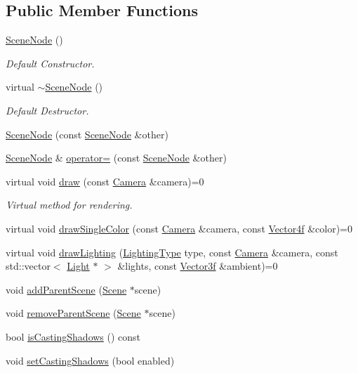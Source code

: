 \subsection*{Public Member Functions}
\begin{DoxyCompactItemize}
\item 
\hyperlink{classburn_1_1_scene_node_a107d42062677132d1104391fd2bf2530}{Scene\-Node} ()
\begin{DoxyCompactList}\small\item\em Default Constructor. \end{DoxyCompactList}\item 
virtual \hyperlink{classburn_1_1_scene_node_a16dc2ff687b1ed4182ca70be08be76a0}{$\sim$\-Scene\-Node} ()
\begin{DoxyCompactList}\small\item\em Default Destructor. \end{DoxyCompactList}\item 
\hyperlink{classburn_1_1_scene_node_a8b3208662e333b416a50ead58fb85a40}{Scene\-Node} (const \hyperlink{classburn_1_1_scene_node}{Scene\-Node} \&other)
\item 
\hyperlink{classburn_1_1_scene_node}{Scene\-Node} \& \hyperlink{classburn_1_1_scene_node_ac46213fd3b6bc544a20ed2ff24352e07}{operator=} (const \hyperlink{classburn_1_1_scene_node}{Scene\-Node} \&other)
\item 
virtual void \hyperlink{classburn_1_1_scene_node_a0fbae6cf806a85819a746169b4e0456f}{draw} (const \hyperlink{classburn_1_1_camera}{Camera} \&camera)=0
\begin{DoxyCompactList}\small\item\em Virtual method for rendering. \end{DoxyCompactList}\item 
virtual void \hyperlink{classburn_1_1_scene_node_a6b8ae5a829ee166354af7b1c6259a7f9}{draw\-Single\-Color} (const \hyperlink{classburn_1_1_camera}{Camera} \&camera, const \hyperlink{namespaceburn_a58a411b9d83c7970518a9250c1c78068}{Vector4f} \&color)=0
\item 
virtual void \hyperlink{classburn_1_1_scene_node_a762372e61d345645c7cdb7a0dd2b22ca}{draw\-Lighting} (\hyperlink{classburn_1_1_scene_node_ac71667bb8707fdadf6b2245d6e6c85cc}{Lighting\-Type} type, const \hyperlink{classburn_1_1_camera}{Camera} \&camera, const std\-::vector$<$ \hyperlink{classburn_1_1_light}{Light} $\ast$ $>$ \&lights, const \hyperlink{namespaceburn_afdd7cfb352b9612432faf6947b6fff74}{Vector3f} \&ambient)=0
\item 
void \hyperlink{classburn_1_1_scene_node_aad77c29ef8deb702c06d3a056857ad6b}{add\-Parent\-Scene} (\hyperlink{classburn_1_1_scene}{Scene} $\ast$scene)
\item 
void \hyperlink{classburn_1_1_scene_node_a8809622b5e55abaab4b4f8c8cd3dc3e8}{remove\-Parent\-Scene} (\hyperlink{classburn_1_1_scene}{Scene} $\ast$scene)
\item 
bool \hyperlink{classburn_1_1_scene_node_a6f082b4329e80c5723e022f52d6ab491}{is\-Casting\-Shadows} () const 
\item 
void \hyperlink{classburn_1_1_scene_node_a64ff21e311418d8539c28e734d70cc92}{set\-Casting\-Shadows} (bool enabled)
\end{DoxyCompactItemize}
